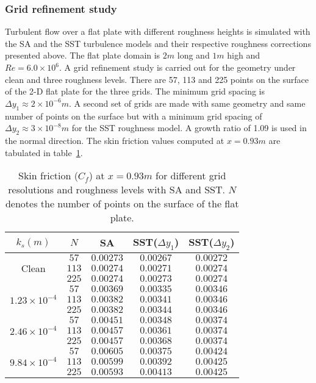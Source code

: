 \subsubsection{Grid refinement study}\label{ssec:fpgridref}
 Turbulent flow over a flat plate with different roughness heights is simulated with  the SA and the SST turbulence models and their respective roughness corrections presented above. The flat plate domain is $2m$ long and $1m$ high and $Re=6.0\times10^6$. A grid refinement study is carried out for the geometry under clean and three roughness levels. There are 57, 113 and 225 points on the surface of the 2-D flat plate for the three grids. The minimum grid spacing is $\Delta y_1 \approx 2\times10^{-6} m$. A second set of grids are made with same geometry and same number of points on the surface but with a minimum grid spacing of $\Delta y_2 \approx 3\times10^{-8} m$ for the SST roughness model. A growth ratio of 1.09 is used in the normal direction. The skin friction values computed at $x=0.93 m$ are tabulated in table~\ref{tab:fpgridref}.
\begin{table}[h!]
\centering
\begin{tabular}{ |c|c|c|c|c| } 
\hline
$k_s (m)$ & $N$ & SA & SST($\Delta y_1$) & SST($\Delta y_2$) \\
\hline
 \multirow{3}{4em}{Clean} & $57$ & $0.00273$ & $0.00267$ & $0.00272$ \\ 
  &  $113$ & $0.00274$ & $0.00271$ & $0.00274$\\ 
  &  $225$ &  $0.00274$  & $0.00273$ & $0.00274$\\ 
 \hline
 \multirow{3}{4em}{$1.23\times10^{-4}$} & $57$ & $0.00369$ & $0.00335$ & $0.00346$\\ 
  &  $113$ & $0.00382$ & $0.00341$ & $0.00346$\\ 
  &  $225$ &  $0.00382$  & $0.00344$ & $0.00346$\\ 
 \hline
 \multirow{3}{4em}{$2.46\times10^{-4}$} & $57$ & $0.00451$ & $0.00348$ & $0.00374$\\ 
  &  $113$ & $0.00457$ & $0.00361$ & $0.00374$\\ 
  &  $225$ & $0.00457$ & $0.00368$ & $0.00374$\\ 
 \hline
\multirow{3}{4em}{$9.84\times10^{-4}$} & $57$ & $0.00605$ & $0.00375$ & $0.00424$\\ 
  &  $113$ & $0.00599$ & $0.00392$ & $0.00425$\\ 
  &  $225$ & $0.00593$ & $0.00413$ & $0.00425$\\ 
 \hline
\end{tabular}
\caption{Skin friction ($C_f$) at $x=0.93 m$ for different grid resolutions and roughness levels with SA and SST. $N$ denotes the number of points on the surface of the flat plate.}
\label{tab:fpgridref}
\end{table}
